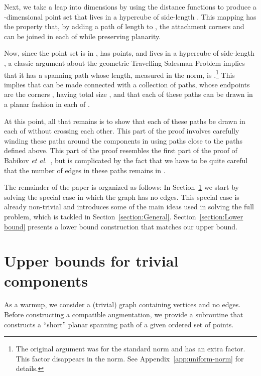 \documentclass[11pt]{patmorin}
\newcommand{\etal}{\emph{et al.}}
\begin{document}
Next, we take a leap into  dimensions by using the distance
functions  to produce a -dimensional point set
 that lives in a hypercube of side-length .
This mapping has the property that, by adding a path of length  to , the attachment corners  and 
can be joined in each of  while preserving planarity.

Now, since the point set  is in , has  points, and lives in a
hypercube of side-length , a classic argument about the geometric
Travelling Salesman Problem \cite{few:shortest,moran:on} implies that it has a
spanning path whose length, measured in the  norm, is
.\footnote{The original argument was for the standard
 norm and has an extra  factor.  This factor disappears
in the  norm.  See Appendix~\ref{app:uniform-norm} for details.}
This implies that  can be made connected with a collection
of  paths, whose endpoints are the corners , having
total size , and that each of these paths can be
drawn in a planar fashion in each of .

At this point, all that remains is to show that each of these  paths
be drawn in each of  without crossing
each other.  This part of the proof involves carefully winding these
paths around the components in  using paths close
to the paths  defined above. This part
of the proof resembles the first part of the proof of Babikov \etal\
\cite{babikov.souvaine.ea:constructing}, but is complicated by the fact
that we have to be quite careful that the number of edges in these paths
remains in . 



The remainder of the paper is organized as follows: In
Section~\ref{section:Trivial components} we start by solving
the special case in which the graph  has no edges. This
special case is already non-trivial and introduces some of the
main ideas used in solving the full problem, which is tackled in
Section~\ref{section:General}. Section~\ref{section:Lower bound}
presents a lower bound construction that matches our upper bound.



\section{Upper bounds for trivial components}\label{section:Trivial components}
As a warmup, we consider a (trivial) graph containing  vertices and no edges.
Before constructing a compatible augmentation, we provide a subroutine
that constructs a ``short'' planar spanning path of a given ordered set of points.
\end{document}

